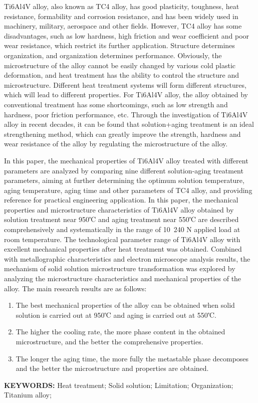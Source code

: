 \documentclass[
class = book,
zihao = -4,
font = noto,
paper = a4paper,
openany
]{easybook}
\begin{document}
\begin{enabstract}
	{\rmfamily
	Ti6Al4V alloy, also known as TC4 alloy, has good plasticity, toughness, heat resistance, formability and corrosion resistance, and has been widely used in machinery, military, aerospace and other fields. However, TC4 alloy has some disadvantages, such as low hardness, high friction and wear coefficient and poor wear resistance, which restrict its further application. Structure determines organization, and organization determines performance. Obviously, the microstructure of the alloy cannot be easily changed by various cold plastic deformation, and heat treatment has the ability to control the structure and microstructure. Different heat treatment systems will form different structures, which will lead to different properties. For Ti6Al4V alloy, the alloy obtained by conventional treatment has some shortcomings, such as low strength and hardness, poor friction performance, etc. Through the investigation of Ti6Al4V alloy in recent decades, it can be found that solution+aging treatment is an ideal strengthening method, which can greatly improve the strength, hardness and wear resistance of the alloy by regulating the microstructure of the alloy.

	In this paper, the mechanical properties of Ti6Al4V alloy treated with different parameters are analyzed by comparing nine different solution-aging treatment parameters, aiming at further determining the optimum solution temperature, aging temperature, aging time and other parameters of TC4 alloy, and providing reference for practical engineering application. In this paper, the mechanical properties and microstructure characteristics of Ti6Al4V alloy obtained by solution treatment near 950℃ and aging treatment near 550℃ are described comprehensively and systematically in the range of 10~240 N applied load at room temperature. The technological parameter range of Ti6Al4V alloy with excellent mechanical properties after heat treatment was obtained. Combined with metallographic characteristics and electron microscope analysis results, the mechanism of solid solution microstructure transformation was explored by analyzing the microstructure characteristics and mechanical properties of the alloy. The main research results are as follows:
	\begin{enumerate}
		\item The best mechanical properties of the alloy can be obtained when solid solution is carried out at 950℃ and aging is carried out at 550℃.
		\item The higher the cooling rate, the more phase content in the obtained microstructure, and the better the comprehensive properties.
		\item The longer the aging time, the more fully the metastable phase decomposes and the better the microstructure and properties are obtained.
	\end{enumerate}
\textbf{KEYWORDS: } Heat treatment; Solid solution; Limitation; Organization; Titanium alloy; }
\end{enabstract}
	\newpage
	\tableofcontents
	\thispagestyle{Xju}
	\setcounter{page}{0}
\end{document}
